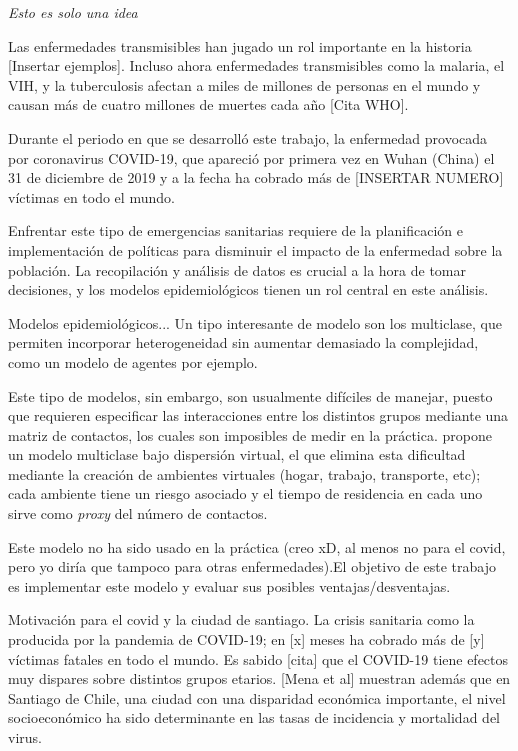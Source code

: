 \begin{intro}

\textit{Esto es solo una idea}

Las enfermedades transmisibles han jugado un rol importante en la historia [Insertar ejemplos]. Incluso ahora enfermedades transmisibles como la malaria, el VIH, y la tuberculosis afectan a miles de millones de personas en el mundo y causan más de cuatro millones de muertes cada año [Cita WHO].

Durante el periodo en que se desarrolló este trabajo, la enfermedad provocada por coronavirus COVID-19, que apareció por primera vez en Wuhan (China) el 31 de diciembre de 2019 y a la fecha ha cobrado más de [INSERTAR NUMERO] víctimas en todo el mundo. 

Enfrentar este tipo de emergencias sanitarias requiere de la planificación e implementación de políticas para disminuir el impacto de la enfermedad sobre la población. La recopilación y análisis de datos es crucial a la hora de tomar decisiones, y los modelos epidemiológicos tienen un rol central en este análisis.

Modelos epidemiológicos... Un tipo interesante de modelo son los multiclase, que permiten incorporar heterogeneidad sin aumentar demasiado la complejidad, como un modelo de agentes por ejemplo. 

Este tipo de modelos, sin embargo, son usualmente difíciles de manejar, puesto que requieren especificar las interacciones entre los distintos grupos mediante una matriz de contactos, los cuales son imposibles de medir en la práctica. \cite{Bichara2015} propone un modelo multiclase bajo dispersión virtual, el que elimina esta dificultad mediante la creación de ambientes virtuales (hogar, trabajo, transporte, etc); cada ambiente tiene un riesgo asociado y el tiempo de residencia en cada uno sirve como \textit{proxy} del número de contactos. 

Este modelo no ha sido usado en la práctica (creo xD, al menos no para el covid, pero yo diría que tampoco para otras enfermedades).El objetivo de este trabajo es implementar este modelo y evaluar sus posibles ventajas/desventajas. 

Motivación para el covid y la ciudad de santiago. 
La crisis sanitaria como la producida por la pandemia de COVID-19; en [x] meses ha cobrado más de [y] víctimas fatales en todo el mundo. Es sabido [cita] que el COVID-19 tiene efectos muy dispares sobre distintos grupos etarios. [Mena et al] muestran además que en Santiago de Chile, una ciudad con una disparidad económica importante, el nivel socioeconómico ha sido determinante en las tasas de incidencia y mortalidad del virus. 


\end{intro}
